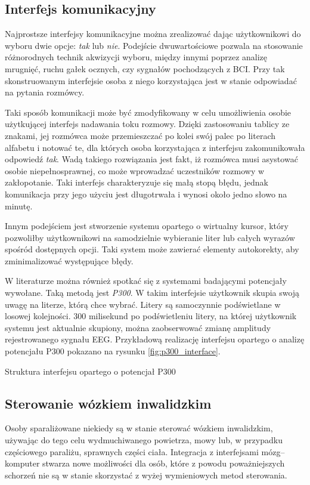 \documentclass[skorowidz,skroty]{dyplomWEZUT}
\begin{document}
\subsection{Interfejs komunikacyjny\label{subsec:p300}}
Najprostsze interfejsy komunikacyjne można zrealizować dając użytkownikowi do wyboru dwie opcje: \textit{tak} lub \textit{nie}. Podejście dwuwartościowe pozwala na stosowanie różnorodnych technik akwizycji wyboru, między innymi poprzez analizę mrugnięć, ruchu gałek ocznych, czy sygnałów pochodzących z BCI. Przy tak skonstruowanym interfejsie osoba z niego korzystająca jest w stanie odpowiadać na pytania rozmówcy.

Taki sposób komunikacji może być zmodyfikowany w celu umożliwienia osobie użytkującej interfejs nadawania toku rozmowy. Dzięki zastosowaniu tablicy ze znakami, jej rozmówca może przemieszczać  po kolei swój palec po literach alfabetu i notować te, dla których osoba korzystająca z interfejsu zakomunikowała odpowiedź \textit{tak}. Wadą takiego rozwiązania jest fakt, iż rozmówca musi asystować osobie niepełnosprawnej, co może wprowadzać uczestników rozmowy w zakłopotanie. Taki interfejs charakteryzuje się małą stopą błędu, jednak komunikacja przy jego użyciu jest długotrwała i wynosi około jedno słowo na minutę\cite{bci_trends}.

Innym podejściem jest stworzenie systemu opartego o wirtualny kursor, który pozwoliłby użytkownikowi na samodzielnie wybieranie liter lub całych wyrazów spośród dostępnych opcji. Taki system może zawierać elementy autokorekty, aby zminimalizować występujące błędy.

W literaturze można również spotkać się z systemami badającymi potencjały wywołane. Taką metodą jest \textit{P300}. W takim interfejsie użytkownik skupia swoją uwagę na literze, którą chce wybrać. Litery są samoczynnie podświetlane w losowej kolejności. 300 milisekund po podświetleniu litery, na której użytkownik systemu jest aktualnie skupiony, można zaobserwować zmianę amplitudy rejestrowanego sygnału EEG\cite{bci_introduction}. Przykładową realizację interfejsu opartego o analizę potencjału P300 pokazano na rysunku \vref{fig:p300_interface}.

{Struktura interfejsu opartego o potencjał P300\label{fig:p300_interface}}
{\cite{p300_interface}}


\subsection{Sterowanie wózkiem inwalidzkim}
Osoby sparaliżowane niekiedy są w stanie sterować wózkiem inwalidzkim, używając do tego celu wydmuchiwanego powietrza, mowy lub, w przypadku częściowego paraliżu, sprawnych części ciała. Integracja z interfejsami mózg--komputer stwarza nowe możliwości dla osób, które z powodu poważniejszych schorzeń nie są w stanie skorzystać z wyżej wymieniowych metod sterowania.
\end{document}
